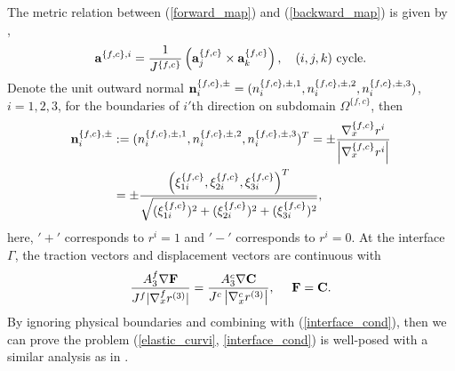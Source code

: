  The metric relation between (\ref{forward_map}) and (\ref{backward_map}) is given by \cite{thompson1985numerical},
\begin{equation*}
{\bf a}^{\{f,c\},i} = \frac{1}{J^{\{f,c\}}}\left({\bf a}_j^{\{f,c\}}\times{\bf a}_k^{\{f,c\}}\right), \ \ \ (i,j,k) \ \mbox{cycle}.
\end{equation*}
Denote the unit outward normal ${\bf n}_i^{\{f,c\},\pm} = (n_i^{\{f,c\},\pm,1},n_i^{\{f,c\},\pm,2},n_i^{\{f,c\},\pm,3})$, $i = 1,2,3$, for the boundaries of $i'$th direction on subdomain $\Omega^{\{f,c\}}$, then
\begin{align}\label{outward_normal}
{\bf n}_i^{\{f,c\},\pm} &:= (n^{\{f,c\},\pm,1}_i,n^{\{f,c\},\pm,2}_i,n^{\{f,c\},\pm,3}_i)^T = \pm \frac{\nabla_x^{\{f,c\}} r^{i}}{\left|\nabla_x^{\{f,c\}} r^{i}\right|} \nonumber\\
&= \pm\frac{ \left(\xi_{1i}^{\{f,c\}},\xi_{2i}^{\{f,c\}},\xi_{3i}^{\{f,c\}}\right)^T}{\sqrt{(\xi_{1i}^{\{f,c\}})^2+(\xi_{2i}^{\{f,c\}})^2+(\xi_{3i}^{\{f,c\}})^2}},
\end{align}
here, $'+'$ corresponds to $r^{i} = 1$ and $'-'$ corresponds to $r^{i} = 0$.  At the interface $\Gamma$, the traction vectors and displacement vectors are continuous with
\begin{equation}\label{interface_cond}
\frac{A_3^f\nabla{\bf F}}{J^f|\nabla_x^f r^{(3)}|}  = \frac{A_3^c\nabla{\bf C}}{J^c\left|\nabla_x^c r^{(3)}\right|}, \ \ \ \ {\bf F} = {\bf C}.
\end{equation}
By ignoring physical boundaries and combining with (\ref{interface_cond}), then we can prove the problem (\ref{elastic_curvi}, \ref{interface_cond}) is well-posed with a similar analysis as in \cite{duru2014stable, petersson2015wave}.


